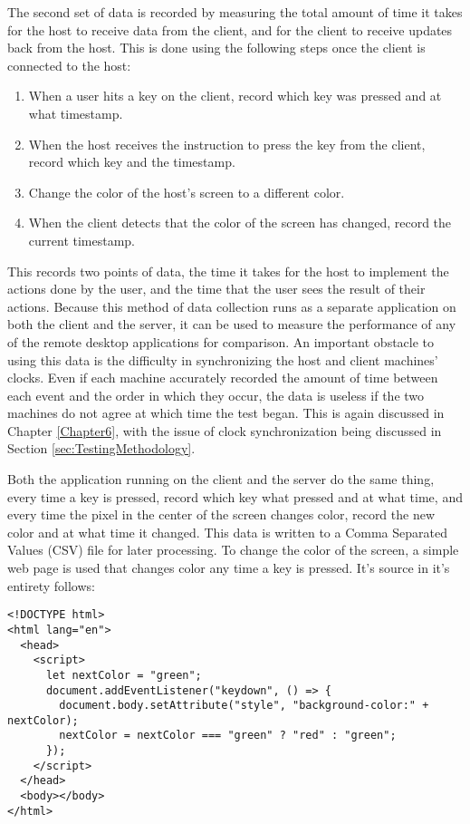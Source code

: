 The second set of data is recorded by measuring the total amount of time it takes for the host to receive data from the client, and for the client to receive updates back from the host.
This is done using the following steps once the client is connected to the host:

\begin{enumerate}
  \item When a user hits a key on the client, record which key was pressed and at what timestamp.
  \item When the host receives the instruction to press the key from the client, record which key and the timestamp.
  \item Change the color of the host's screen to a different color.
  \item When the client detects that the color of the screen has changed, record the current timestamp.
\end{enumerate}

This records two points of data, the time it takes for the host to implement the actions done by the user, and the time that the user sees the result of their actions.
Because this method of data collection runs as a separate application on both the client and the server, it can be used to measure the performance of any of the remote desktop applications for comparison.
An important obstacle to using this data is the difficulty in synchronizing the host and client machines' clocks.
Even if each machine accurately recorded the amount of time between each event and the order in which they occur, the data is useless if the two machines do not agree at which time the test began.
This is again discussed in Chapter \ref{Chapter6}, with the issue of clock synchronization being discussed in Section \ref{sec:TestingMethodology}.

Both the application running on the client and the server do the same thing, every time a key is pressed, record which key what pressed and at what time, and every time the pixel in the center of the screen changes color, record the new color and at what time it changed.
This data is written to a Comma Separated Values (CSV) file for later processing.
To change the color of the screen, a simple web page is used that changes color any time a key is pressed.
It's source in it's entirety follows:

\begin{lstlisting}[style=customhtml,title=\emph{/datalogger/web/index.html}]
<!DOCTYPE html>
<html lang="en">
  <head>
    <script>
      let nextColor = "green";
      document.addEventListener("keydown", () => {
        document.body.setAttribute("style", "background-color:" + nextColor);
        nextColor = nextColor === "green" ? "red" : "green";
      });
    </script>
  </head>
  <body></body>
</html>
\end{lstlisting}

